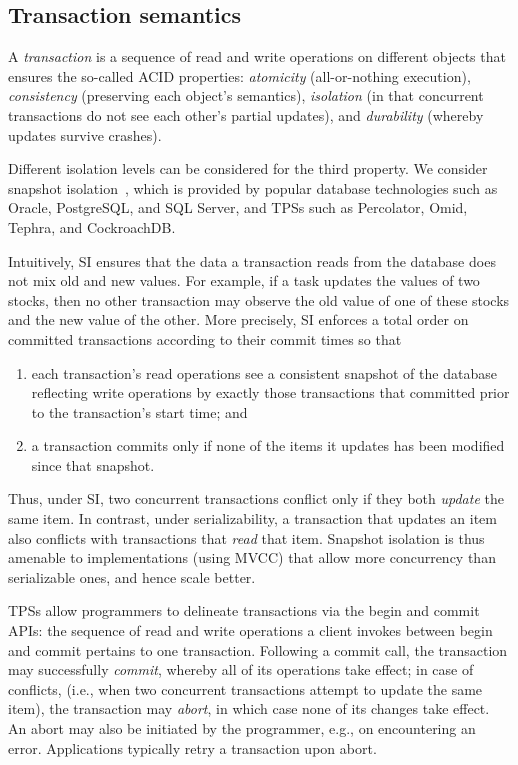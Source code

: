 \subsection{Transaction semantics} \label{ssec:transactions}

A \emph{transaction} is a sequence of read and write operations on different objects that ensures the so-called ACID properties:
\emph{atomicity} (all-or-nothing execution), \emph{consistency} (preserving each object's semantics), 
\emph{isolation} (in that concurrent transactions do not see each other's partial updates), and 
\emph{durability} (whereby updates survive crashes).

Different isolation levels can be considered for the third property. We consider 
snapshot isolation~\cite{DBLP:conf/sigmod/BerensonBGMOO95}, 
which is provided by popular database technologies such as Oracle, PostgreSQL, and SQL Server,
and TPSs such as Percolator, Omid, Tephra, and  CockroachDB.

Intuitively, SI ensures that the data a transaction reads from the database 
does not mix old and new values. For example, if a task updates the values of two stocks, then no other transaction may observe the old value of one of these stocks and the new value of the other. 
%
More precisely, SI enforces a total order on committed transactions according to their commit times so that 
\begin{enumerate}
    \setlength{\itemsep}{0pt}
    \setlength{\parskip}{0pt}
    \setlength{\parsep}{2pt}  
\item
each transaction's read operations see a consistent snapshot of the database reflecting write operations by
 exactly those transactions that committed prior to the transaction's start time; and 
\item
 a transaction commits only if none of the items it updates has been modified since that snapshot.
 \end{enumerate}
Thus, under SI, two concurrent transactions conflict only if they both \emph{update} the same item.  
In contrast, under serializability, a transaction that updates an item also conflicts with transactions that \emph{read} that item. Snapshot isolation is thus amenable to implementations (using MVCC) that 
allow more concurrency than serializable ones, and hence scale better.

TPSs allow programmers to  delineate transactions via the begin and commit APIs: 
the sequence of read and write operations a client invokes between begin and  commit pertains to one transaction.
Following a commit call, the transaction may successfully \emph{commit}, whereby all of its operations take effect;
in case of conflicts, (i.e., when two concurrent transactions attempt to update the same item), the transaction may
\emph{abort}, in which case none of its changes take effect. An abort may also be initiated by the programmer, e.g., 
on encountering an error. Applications typically retry a transaction upon  abort. 


